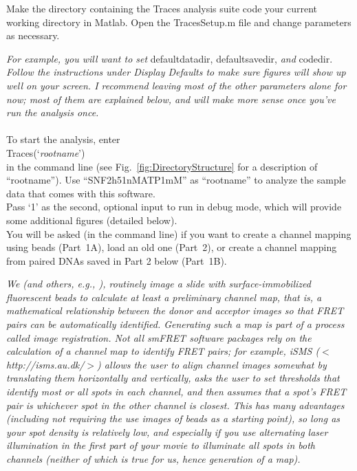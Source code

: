 \documentclass[11pt]{article}
\newcommand{\sj}[1]{\textcolor{red}{#1}}
\begin{document}
Make the directory containing the Traces analysis suite code your current working directory in Matlab. Open the TracesSetup.m file and change parameters as necessary. 

{\it For example, you will want to set } defaultdatadir, defaultsavedir, {\it and} codedir. {\it Follow the instructions under Display Defaults to make sure figures will show up well on your screen.  I recommend leaving most of the other parameters alone for now; most of them are explained below, and will make more sense once you've run the analysis once.}\\
\\
To start the analysis, enter\\

\noindent Traces(`{\it rootname}')\\

\noindent in the command line (see Fig.~\ref{fig:DirectoryStructure} for a description of ``rootname'').  Use ``SNF2h51nMATP1mM'' as ``rootname'' to analyze the sample data that comes with this software.  \\


\noindent Pass `1' as the second, optional input to run in debug mode, which will provide some additional figures (detailed below).\\

\noindent You will be asked (in the command line) if you want to create a channel mapping using beads (Part~1A), load an old one (Part~2), or create a channel mapping from paired DNAs saved in Part 2 below (Part~1B). 

{\it We (and others, e.g., \cite{Deindl2012}), routinely image a slide with surface-immobilized fluorescent beads to calculate at least a preliminary channel map, that is, a mathematical relationship between the donor and acceptor images so that FRET pairs can be automatically identified. Generating such a map is part of a process called image registration. Not all smFRET software packages rely on the calculation of a channel map to identify FRET pairs; for example, iSMS ($<$http://isms.au.dk/$>$) allows the user to align channel images somewhat by translating them horizontally and vertically, asks the user to set thresholds that identify most or all spots in each channel, and then assumes that a spot's FRET pair is whichever spot in the other channel is closest. This has many advantages (including not requiring the use images of beads as a starting point), so long as your spot density is relatively low, and especially if you use alternating laser illumination in the first part of your movie to illuminate all spots in both channels (neither of which is true for us, hence generation of a map).}
\end{document}
